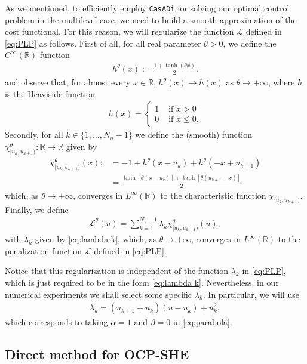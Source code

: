 \documentclass[twocolumn]{autart}    %
\begin{document}
As we mentioned, to efficiently employ \texttt{CasADi} for solving our optimal control problem in the multilevel case, we need to build a smooth approximation of the cost functional. For this reason, we will regularize the function $\mathcal L$ defined in \eqref{eq:PLP} as follows. First of all, for all real parameter $\theta>0$, we define the $C^\infty(\mathbb{R})$ function
\begin{align*}
	\displaystyle h^\theta(x) := \frac{1 + \tanh(\theta x)}{2}.
\end{align*}
and observe that, for almost every $x\in \mathbb{R}$, $h^\theta(x)\to h(x)$ as $\theta\to +\infty$, where $h$ is the Heaviside function 
\begin{align*}
	h(x) = \begin{cases}
		1 & \text{ if } x > 0 
		\\
		0 & \text{ if } x \leq 0.
	\end{cases}
\end{align*}
Secondly, for all $k \in \{1,\dots,N_u-1\}$ we define the (smooth) function $\chi_{[u_k,u_{k+1})}^\theta:\mathbb{R} \rightarrow \mathbb{R}$ given by
\begin{align*}
	\chi_{[u_k,u_{k+1})}^\theta(x) :&= - 1 + h^\theta(x-u_k) + h^\theta(-x+u_{k+1}) 
	\\[5pt]
	&= \frac{\tanh[\theta(x-u_k)] + \tanh[\theta (u_{k+1}-x)]}{2}
\end{align*}
which, as $\theta\to +\infty$, converges in $L^\infty(\mathbb{R})$ to the characteristic function $\chi_{[u_k,u_{k+1})}$. Finally, we define
\begin{align}\label{eq:Lsmooth}
	\mathcal{L}^\theta(u) = \sum_{k = 1}^{N_u-1} \lambda_k \chi^\theta_{[u_k,u_{k+1})}(u),
\end{align}
with $\lambda_k$ given by \eqref{eq:lambda k}, which, as $\theta\to +\infty$, converges in $L^\infty(\mathbb{R})$ to the penalization function $\mathcal L$ defined in \eqref{eq:PLP}.

Notice that this regularization is independent of the function $\lambda_k$ in \eqref{eq:PLP}, which is just required to be in the form \eqref{eq:lambda k}. Nevertheless, in our numerical experiments we shall select some specific $\lambda_k$. In particular, we will use 
\begin{gather}
	\lambda_k = (u_{k+1}+u_{k}) (u-u_k) + u_k^2, 
\end{gather}
which corresponds to taking $\alpha=1$ and $\beta=0$ in \eqref{eq:parabola}.

\subsection{Direct method  for OCP-SHE}
\end{document}
